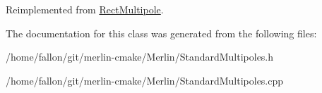 Reimplemented from \hyperlink{classRectMultipole_a2626d08254eee03cffb73abb20a9381a}{Rect\+Multipole}.



The documentation for this class was generated from the following files\+:\begin{DoxyCompactItemize}
\item 
/home/fallon/git/merlin-\/cmake/\+Merlin/Standard\+Multipoles.\+h\item 
/home/fallon/git/merlin-\/cmake/\+Merlin/Standard\+Multipoles.\+cpp\end{DoxyCompactItemize}
